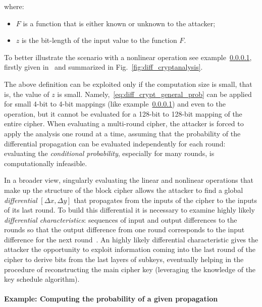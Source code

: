                 \noindent where:

                \begin{itemize}
                    \item $F$ is a function that is either known or unknown to the attacker;
                    \item $z$ is the bit-length of the input value to the function $F$.
                \end{itemize}
                
                To better illustrate the scenario with a nonlinear operation see example~\ref{par:diff_crypt_ex}, firstly given in~\cite{sakiyama2016security} and summarized in Fig.~\ref{fig:diff_cryptanalysis}.

                The above definition can be exploited only if the computation size is small, that is, the value of $z$ is small. Namely,~\ref{eq:diff_crypt_general_prob} can be applied for small 4-bit to 4-bit mappings (like example~\ref{par:diff_crypt_ex}) and even to the \aes{} \sbocs{} operation, but it cannot be evaluated for a 128-bit to 128-bit mapping of the entire \aes{} cipher. When evaluating a multi-round cipher, the attacker is forced to apply the analysis one round at a time, assuming that the probability of the differential propagation can be evaluated independently for each round: evaluating the \emph{conditional probability}, especially for many rounds, is computationally infeasible.

                In a broader view, singularly evaluating the linear and nonlinear operations that make up the structure of the block cipher allows the attacker to find a global \emph{differential} $[\Delta x, \Delta y]$ that propagates from the inputs of the cipher to the inputs of its last round. To build this differential it is necessary to examine highly likely \emph{differential characteristics}: sequences of input and output differences to the rounds so that the output difference from one round corresponds to the input difference for the next round~\cite{heys2002tutorial}. An highly likely differential characteristic gives the attacker the opportunity to exploit information coming into the last round of the cipher to derive bits from the last layers of subkeys, eventually helping in the procedure of reconstructing the main cipher key (leveraging the knowledge of the key schedule algorithm).

            \paragraph{Example: Computing the probability of a given propagation}\label{par:diff_crypt_ex}

